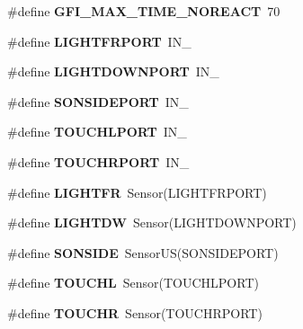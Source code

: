 \begin{DoxyCompactItemize}
\item 
\hypertarget{calibrate_8nxc_acf448a4b51caadc3612dd7fe1e6d989c}{
\#define {\bfseries GFI\_\-MAX\_\-TIME\_\-NOREACT}~70}
\label{calibrate_8nxc_acf448a4b51caadc3612dd7fe1e6d989c}

\item 
\hypertarget{calibrate_8nxc_ab9d3d1049b45438591608c99774c5cba}{
\#define {\bfseries LIGHTFRPORT}~IN\_}
\label{calibrate_8nxc_ab9d3d1049b45438591608c99774c5cba}

\item 
\hypertarget{calibrate_8nxc_a5103b4e7f1559cfe1f24513bd3d797c2}{
\#define {\bfseries LIGHTDOWNPORT}~IN\_}
\label{calibrate_8nxc_a5103b4e7f1559cfe1f24513bd3d797c2}

\item 
\hypertarget{calibrate_8nxc_a73b327cc697b593b06f47bc6915ba9cf}{
\#define {\bfseries SONSIDEPORT}~IN\_}
\label{calibrate_8nxc_a73b327cc697b593b06f47bc6915ba9cf}

\item 
\hypertarget{calibrate_8nxc_a867a2479cd5e144bc98b3e24bd48a79c}{
\#define {\bfseries TOUCHLPORT}~IN\_}
\label{calibrate_8nxc_a867a2479cd5e144bc98b3e24bd48a79c}

\item 
\hypertarget{calibrate_8nxc_ac16330478e7b003e00f37e90e0c5bdf6}{
\#define {\bfseries TOUCHRPORT}~IN\_}
\label{calibrate_8nxc_ac16330478e7b003e00f37e90e0c5bdf6}

\item 
\hypertarget{calibrate_8nxc_a26fd581a2d8a8f58a30535495c8d0843}{
\#define {\bfseries LIGHTFR}~Sensor(LIGHTFRPORT)}
\label{calibrate_8nxc_a26fd581a2d8a8f58a30535495c8d0843}

\item 
\hypertarget{calibrate_8nxc_aadf3c356fd812224ab384f9780155c1a}{
\#define {\bfseries LIGHTDW}~Sensor(LIGHTDOWNPORT)}
\label{calibrate_8nxc_aadf3c356fd812224ab384f9780155c1a}

\item 
\hypertarget{calibrate_8nxc_aec1d71dea61f39acce761840c4ce0d27}{
\#define {\bfseries SONSIDE}~SensorUS(SONSIDEPORT)}
\label{calibrate_8nxc_aec1d71dea61f39acce761840c4ce0d27}

\item 
\hypertarget{calibrate_8nxc_a98c4f75c182ff1c7c6f3fb288f4f3857}{
\#define {\bfseries TOUCHL}~Sensor(TOUCHLPORT)}
\label{calibrate_8nxc_a98c4f75c182ff1c7c6f3fb288f4f3857}

\item 
\hypertarget{calibrate_8nxc_a6537370af17fd38a56bcf670d8db23e3}{
\#define {\bfseries TOUCHR}~Sensor(TOUCHRPORT)}
\label{calibrate_8nxc_a6537370af17fd38a56bcf670d8db23e3}


\end{DoxyCompactItemize}
